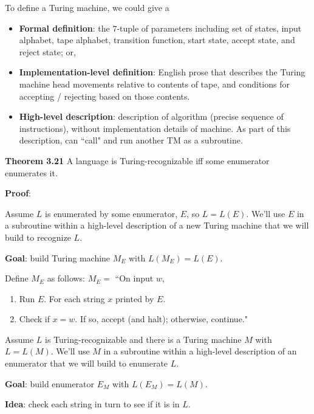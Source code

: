 

To define a Turing machine, we could give a 
\begin{itemize}
\item {\bf Formal definition}: the $7$-tuple of parameters including set of states, 
input alphabet, tape alphabet, transition function, start state, accept state, and reject state; or,
\item {\bf Implementation-level definition}: English prose that describes the Turing machine head 
movements relative to contents of tape, and conditions for accepting / rejecting based on those contents.
\item {\bf High-level description}: description of algorithm (precise sequence of instructions), 
without implementation details of machine. As part of this description, can ``call" and run 
another TM as a subroutine.
\end{itemize}


{\bf Theorem 3.21} A language is Turing-recognizable iff some enumerator enumerates it.

{\bf Proof}:

Assume $L$ is enumerated by some enumerator, $E$, so $L = L(E)$.
We'll use $E$ in a subroutine
within a high-level description of a new Turing machine that we will build to recognize $L$.

{\bf Goal}: build Turing machine $M_E$ with $L(M_E) = L(E)$.

Define $M_E$ as follows: $M_E = $ ``On input $w$,
\begin{enumerate}
\item Run $E$. For each string $x$ printed by $E$.
\item \qquad Check if $x = w$. If so, accept (and halt); otherwise, continue."
\end{enumerate}


\vfill 



Assume $L$ is Turing-recognizable and there 
is a Turing  machine  $M$ with  $L = L(M)$. We'll use $M$ in a subroutine
within a high-level description of an enumerator that we will build to enumerate $L$.

{\bf Goal}: build enumerator $E_M$ with $L(E_M) = L(M)$.

{\bf Idea}: check each string in turn to see if it is in $L$.

